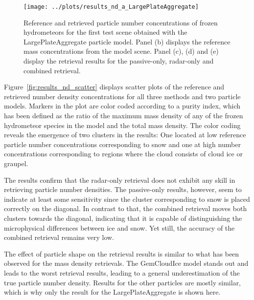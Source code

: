 \documentclass[journal abbreviation, manuscript]{copernicus}
\begin{document}
\begin{figure}
\centering
\texttt{[image: ../plots/results\_nd\_a\_LargePlateAggregate]}
\caption{Reference and retrieved particle number concentrations of frozen
  hydrometeors for the first test scene obtained with the LargePlateAggregate
  particle model. Panel (b) displays the reference mass concentrations from the
  model scene. Panel (c), (d) and (e) display the retrieval results for the
  passive-only, radar-only and combined retrieval.}
\label{fig:results_nd_a}
\end{figure}

Figure~\ref{fig:results_nd_scatter} displays scatter plots of the reference and
retrieved number density concentrations for all three methods and two particle
models. Markers in the plot are color coded according to a purity index, which
has been defined as the ratio of the maximum mass density of any of the frozen
hydrometeor species in the model and the total mass density. The color coding
reveals the emergence of two clusters in the results: One located at low
reference particle number concentrations corresponding to snow and one at
high number concentrations corresponding to regions where the cloud consists
of cloud ice or graupel.

The results confirm that the radar-only retrieval does not exhibit any skill in
retrieving particle number densities. The passive-only results, however, seem to
indicate at least some sensitivity since the cluster corresponding to snow is
placed correctly on the diagonal. In contrast to that, the combined retrieval
moves both clusters towards the diagonal, indicating that it is capable of
distinguishing the microphysical differences between ice and snow. Yet still,
the accuracy of the combined retrieval remains very low.

The effect of particle shape on the retrieval results is similar to what has
been observed for the mass density retrievals. The GemCloudIce model stands out
and leads to the worst retrieval results, leading to a general underestimation
of the true particle number density. Results for the other particles are mostly
similar, which is why only the result for the LargePlateAggregate is shown here.
\end{document}
